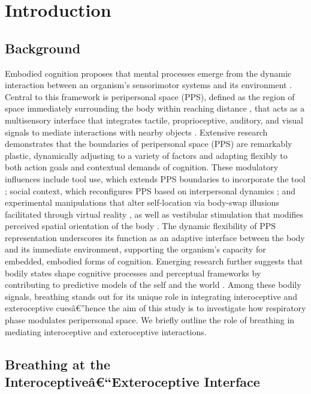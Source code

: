 \section{Introduction}

\subsection{Background}
Embodied cognition proposes that mental processes emerge from the dynamic interaction between an organism's sensorimotor systems and its environment \citep{Glenberg2010, Barsalou2008}. Central to this framework is peripersonal space (PPS), defined as the region of space immediately surrounding the body within reaching distance \citep{rizzolatti1997space}, that acts as a multisensory interface that integrates tactile, proprioceptive, auditory, and visual signals to mediate interactions with nearby objects \citep{Serino2019, diPellegrino2015, serino2015bodypart}. Extensive research demonstrates that the boundaries of peripersonal space (PPS) are remarkably plastic, dynamically adjusting to a variety of factors and adapting flexibly to both action goals and contextual demands of cognition. These modulatory influences include tool use, which extends PPS boundaries to incorporate the tool \citep{iriki1996coding, maravita2004tools}; social context, which reconfigures PPS based on interpersonal dynamics \citep{teneggi2013social}; and experimental manipulations that alter self-location via body-swap illusions facilitated through virtual reality \citep{noel2015peripersonal}, as well as vestibular stimulation that modifies perceived spatial orientation of the body \citep{pfeiffer2018vestibular}. The dynamic flexibility of PPS representation underscores its function as an adaptive interface between the body and its immediate environment, supporting the organism's capacity for embedded, embodied forms of cognition. Emerging research further suggests that bodily states shape cognitive processes and perceptual frameworks by contributing to predictive models of the self and the world \citep{barsalou2008grounded, seth2013interoceptive, linson2018active, barrett2016theory}. Among these bodily signals, breathing stands out for its unique role in integrating interoceptive and exteroceptive cuesâ€”hence the aim of this study is to investigate how respiratory phase modulates peripersonal space. We briefly outline the role of breathing in mediating interoceptive and exteroceptive interactions.

\subsection{Breathing at the Interoceptiveâ€“Exteroceptive Interface}

